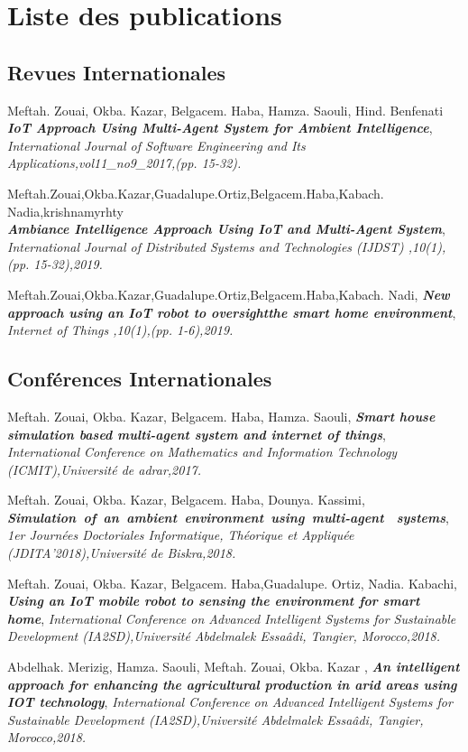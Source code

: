 
\chapter{Liste des publications}

\section{Revues Internationales}
Meftah. Zouai, Okba. Kazar, Belgacem. Haba, Hamza. Saouli, Hind. Benfenati \\
\textit{\textbf{IoT Approach Using Multi-Agent System for Ambient Intelligence}},
\emph{International Journal of Software Engineering and Its Applications,vol11\_no9\_2017,(pp. 15-32).}



Meftah.Zouai,Okba.Kazar,Guadalupe.Ortiz,Belgacem.Haba,Kabach. Nadia,krishnamyrhty\\
\textit{\textbf{Ambiance Intelligence Approach Using IoT and Multi-Agent System}},
\emph{ International Journal of Distributed Systems and Technologies (IJDST) ,10(1),(pp. 15-32),2019.}



Meftah.Zouai,Okba.Kazar,Guadalupe.Ortiz,Belgacem.Haba,Kabach. Nadi,
\textit{\textbf{New approach using an IoT robot to oversightthe smart home environment}},
\emph{ Internet of Things ,10(1),(pp. 1-6),2019.}

\section{Conférences Internationales}
Meftah. Zouai, Okba. Kazar, Belgacem. Haba, Hamza. Saouli,
\textit{\textbf{Smart house simulation based multi-agent system and internet of things}},
\emph{International Conference on Mathematics and Information Technology (ICMIT),Université de adrar,2017.}



Meftah. Zouai, Okba. Kazar, Belgacem. Haba, Dounya. Kassimi,
\textit{\textbf{Simulation of an ambient environment using multi‐agent 
systems}},
\emph{1er Journées Doctoriales Informatique, Théorique et Appliquée (JDITA'2018),Université de Biskra,2018.}



Meftah. Zouai, Okba. Kazar, Belgacem. Haba,Guadalupe. Ortiz,
Nadia. Kabachi,
\textit{\textbf{Using an IoT mobile robot to sensing the environment for
smart home}},
\emph{International Conference on Advanced Intelligent Systems for Sustainable Development (IA2SD),Université Abdelmalek Essaâdi, Tangier, Morocco,2018.}



Abdelhak. Merizig, Hamza. Saouli, Meftah. Zouai, Okba. Kazar ,
\textit{\textbf{An intelligent approach for enhancing the agricultural
production in arid areas using IOT technology}},
\emph{International Conference on Advanced Intelligent Systems for Sustainable Development (IA2SD),Université Abdelmalek Essaâdi, Tangier, Morocco,2018.}



